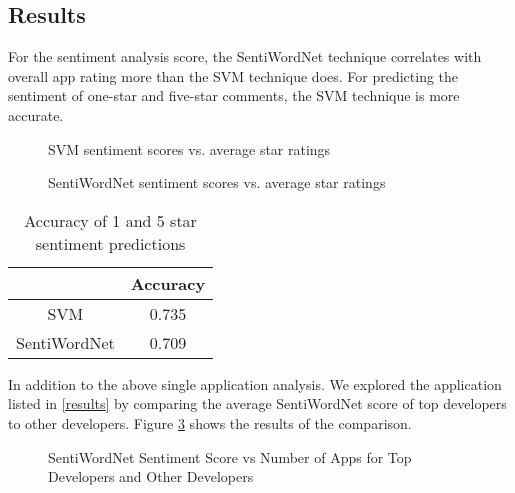 \documentclass{acm_proc_article-sp}
\begin{document}

\subsection{Results}
For the sentiment analysis score, the SentiWordNet technique correlates with overall app rating more than the SVM technique does.  For predicting the sentiment of one-star and five-star comments, the SVM technique is more accurate.

\begin{figure}[!h]
\centering
{}
\caption{SVM sentiment scores vs. average star ratings}
\label{fig:myfig1}
\end{figure}

\begin{figure}[!h]
\centering
{}
\caption{SentiWordNet sentiment scores vs. average star ratings}
\label{fig:myfig2}
\end{figure}

\begin{table}[!h]
\centering
\caption{Accuracy of 1 and 5 star sentiment predictions}
\begin{tabular}{|c|c|}
\hline
& \textbf{Accuracy} \\ \hline
SVM & 0.735 \\ \hline
SentiWordNet & 0.709 \\ \hline
\end{tabular}
\end{table}

In addition to the above single application analysis. We explored the application listed in \ref{results} by comparing the average SentiWordNet score
of top developers to other developers. Figure \ref{fig:myfig3} shows the results of the comparison.
\begin{figure}[!h]
\centering
{}
\caption{SentiWordNet Sentiment Score vs Number of Apps for Top Developers and Other Developers}
\label{fig:myfig3}
\end{figure}
\end{document}

